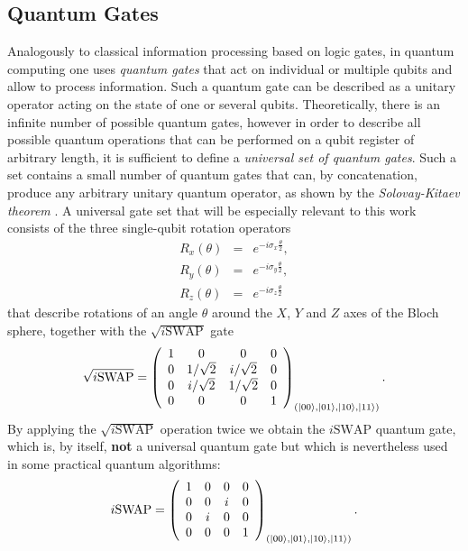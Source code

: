 \subsection{Quantum Gates}

Analogously to classical information processing based on logic gates, in quantum computing one uses {\it quantum gates} that act on individual or multiple qubits and allow to process information. Such a quantum gate can be described as a unitary operator acting on the state of one or several qubits. Theoretically, there is an infinite number of possible quantum gates, however in order to describe all possible quantum operations that can be performed on a qubit register of arbitrary length, it is sufficient to define a {\it universal set of quantum gates}. Such a set contains a small number of quantum gates that can, by concatenation, produce any arbitrary unitary quantum operator, as shown by the {\it Solovay-Kitaev theorem} \citep{nielsen_quantum_2000,dawson_solovay-kitaev_2005}. A universal gate set that will be especially relevant to this work consists of the three single-qubit rotation operators
%
\begin{eqnarray}
   R_x(\theta)  & = & e^{-i\sigma_x\frac{\theta}{2}}, \\ 
   R_y(\theta)  & = & e^{-i\sigma_y\frac{\theta}{2}}, \\ 
   R_z(\theta)  & = & e^{-i\sigma_z\frac{\theta}{2}} 
\label{eq:universal_single_qubit_gates}
\end{eqnarray}
%
that describe rotations of an angle $\theta$ around the $X$, $Y$ and $Z$ axes of the Bloch sphere, together with the $\sqrt{i\mathrm{SWAP}}$ gate
%
\begin{equation}
\sqrt{i\mathrm{SWAP}} = \left( \begin{array}{cccc} 1 & 0 & 0 & 0 \\ 0 & 1/\sqrt{2} & i/\sqrt{2} & 0 \\ 0 & i/\sqrt{2} & 1/\sqrt{2} & 0 \\ 0 & 0 & 0 & 1  \end{array}  \right)_{(\left| 00 \right>,\left| 01 \right>,\left| 10 \right>,\left| 11 \right>)}.
\end{equation}
%
By applying the $\sqrt{i\mathrm{SWAP}}$ operation twice we obtain the $i\mathrm{SWAP}$ quantum gate, which is, by itself, \textbf{not} a universal quantum gate but which is nevertheless used in some practical quantum algorithms:
%
\begin{equation}
i\mathrm{SWAP} = \left( \begin{array}{cccc} 1 & 0 & 0 & 0 \\ 0 & 0 & i & 0 \\ 0 & i & 0 & 0 \\ 0 & 0 & 0 & 1  \end{array}  \right)_{(\left| 00 \right>,\left| 01 \right>,\left| 10 \right>,\left| 11 \right>)}.
\end{equation}
%

